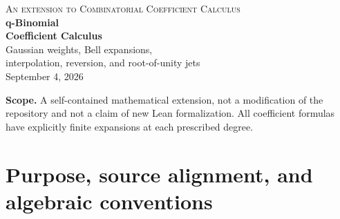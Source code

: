 \documentclass[11pt,a4paper]{article}
\numberwithin{equation}{section}
\theoremstyle{definition}
\theoremstyle{remark}
\begin{document}
\begin{titlepage}
\thispagestyle{empty}
\vspace*{20mm}
\begin{center}
{\small\scshape An extension to Combinatorial Coefficient Calculus}\\[12mm]
{\Huge\bfseries q-Binomial\\[3mm] Coefficient Calculus}\\[8mm]
{\Large Gaussian weights, Bell expansions,\\[2mm]
interpolation, reversion, and root-of-unity jets}\\[12mm]
{\large September 4, 2026}
\end{center}
\vspace{10mm}
\begin{abstract}
Gaussian binomial coefficients fit into coefficient calculus in several different,
noninterchangeable ways: as elementary and complete symmetric functions on geometric
alphabets, as convolution structure constants, as interpolation matrices on
$q$-integer nodes, and as polynomials whose local expansions are governed by
Bernoulli, Stirling, and Bell numbers. This article develops those connections with
explicit hypotheses and proofs. A finite partition-sum kernel evaluates arbitrary
powers of products of $q$-shifted factorials, their compositions, and their
Lagrange--B\"urmann inverses. Further results include weighted $q$-binomial inversion,
two Newton interpolation formulas, a normalization-specific $q$-Stirling calculus,
ordinary composition in $q$-divided-power coordinates, coupled two-variable
inversion, exact geometric extrapolation, and formulas for every derivative of a
Gaussian polynomial at every root of unity. Classical identities are distinguished
from the organizing synthesis. In particular, a change of factorial normalization
is not confused with a Jackson chain rule, and distinct $q$-Catalan constructions
are not identified. A reproducible exact-arithmetic verification program accompanies
the source and rendered article; its finite tests supplement, rather than replace,
the proofs.
\end{abstract}
\vfill
\noindent\textbf{Scope.} A self-contained mathematical extension, not a modification
of the repository and not a claim of new Lean formalization. All coefficient
formulas have explicitly finite expansions at each prescribed degree.
\end{titlepage}
\tableofcontents
\newpage

\section{Purpose, source alignment, and algebraic conventions}\label{sec:scope}
\end{document}
